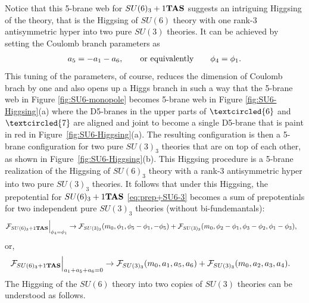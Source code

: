 Notice that this 5-brane web for $SU(6)_3+1{\bf TAS}$ suggests an intriguing Higgsing of the theory,  that is the Higgsing of $SU(6)$ theory with one rank-3 antisymmetric hyper into two pure $SU(3)$ theories. It can be achieved by setting the Coulomb branch parameters as
 \begin{align}
 	a_5= - a_1-a_6, \qquad {\rm or~equivalently} \qquad \phi_4=\phi_1. \label{eq:HiggisingToSU3}
 \end{align}
 This tuning of the parameters, of course, reduces the dimension of Coulomb brach  by one and also opens up a Higgs branch in such a way that the 5-brane web in Figure \ref{fig:SU6-monopole} becomes 5-brane web in Figure \ref{fig:SU6-Higgsing}(a) where the D5-branes in the upper parts of $\textcircled{\scriptsize 6}$ and $\textcircled{\scriptsize 7}$ are aligned and joint to become a single D5-brane that is paint in red in Figure~\ref{fig:SU6-Higgsing}(a). The resulting configuration is then a 5-brane configuration for two pure $SU(3)_3$ theories that are on top of each other, as shown in Figure~\ref{fig:SU6-Higgsing}(b). This Higgsing procedure is a 5-brane realization of the Higgsing of $SU(6)_3$ theory with a rank-3 antisymmetric hyper into two pure $SU(3)_3$ theories. It follows that 
 under this Higgsing, the prepotential for $SU(6)_3+1{\bf TAS}$ \eqref{eq:prep+SU6-3} becomes a sum of prepotentials for two independent pure $SU(3)_3$ theories (without bi-fundemantals):
\begin{align}
\mathcal{F}_{SU(6)_{3}+1{\bf TAS}}{}\Big|_{\phi_4=\phi_1}	&
\rightarrow \mathcal{F}_{SU(3)_{3}} (m_0, \phi_1, \phi_5-\phi_1,-\phi_5) + \mathcal{F}_{SU(3)_{3}} (m_0, \phi_2-\phi_1, \phi_3-\phi_2,\phi_1-\phi_3),\nonumber
\end{align}
or,
\begin{align}
\mathcal{F}_{SU(6)_{3}+1{\bf TAS}}{}\Big|_{a_1+a_5+a_6=0}	%
&\rightarrow \mathcal{F}_{SU(3)_3}(m_0,a_1,a_5,a_6)+\mathcal{F}_{SU(3)_3}(m_0,a_2,a_3,a_4).
\end{align}
The Higgsing of the $SU(6)$ theory into two copies of $SU(3)$ theories can be understood as follows. %
